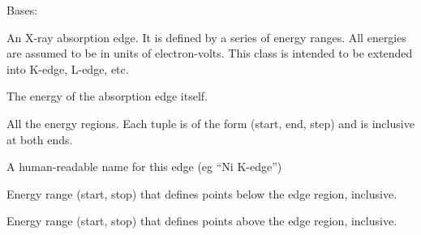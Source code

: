 \documentclass[letterpaper,10pt,english]{sphinxmanual}
\begin{document}
\begin{fulllineitems}
\label{\detokenize{xanespy:xanespy.edges.Edge}}
Bases: 

An X-ray absorption edge. It is defined by a series of energy
ranges. All energies are assumed to be in units of
electron-volts. This class is intended to be extended into K-edge,
L-edge, etc.

\begin{fulllineitems}
\label{\detokenize{xanespy:xanespy.edges.Edge.E_0}}
 \textendash{} The energy of the absorption edge itself.

\end{fulllineitems}


\begin{fulllineitems}
\label{\detokenize{xanespy:xanespy.edges.Edge.regions}}
 \textendash{} All the energy regions. Each tuple is of the form (start, end,
step) and is inclusive at both ends.

\end{fulllineitems}


\begin{fulllineitems}
\label{\detokenize{xanespy:xanespy.edges.Edge.name}}
 \textendash{} A human-readable name for this edge (eg “Ni K-edge”)

\end{fulllineitems}


\begin{fulllineitems}
\label{\detokenize{xanespy:xanespy.edges.Edge.pre_edge}}
 \textendash{} Energy range (start, stop) that defines points below the edge
region, inclusive.

\end{fulllineitems}


\begin{fulllineitems}
\label{\detokenize{xanespy:xanespy.edges.Edge.post_edge}}
 \textendash{} Energy range (start, stop) that defines points above the edge
region, inclusive.


\end{fulllineitems}
\end{fulllineitems}
\end{document}
